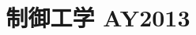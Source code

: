 \documentclass[11pt,a4paper]{article}
\title{制御工学 AY2013}
\author{}
\date{}
\begin{document}
\maketitle


\bigskip

\end{document}
